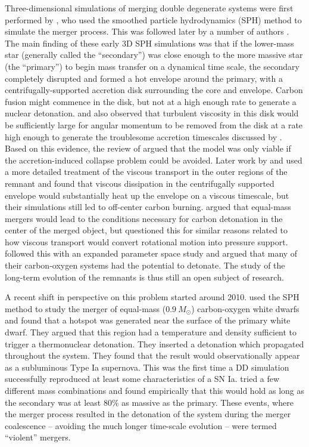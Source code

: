 \documentclass[iop]{emulateapj}
\begin{document}
Three-dimensional simulations of merging double degenerate systems were 
first performed by \citet{benz:1990}, who used the smoothed particle
hydrodynamics (SPH) method to simulate the merger process. This was 
followed later by a number of authors 
\citep{rasio_shapiro:1995,segretain:1997,guerrero:2004,yoon:2007,loren-aguilar:2009,raskin:2012}.
The main finding of these early 3D SPH simulations was that if the 
lower-mass star (generally called the ``secondary'') was
close enough to the more massive star (the ``primary'') to begin mass
transfer on a dynamical time scale, the secondary completely disrupted
and formed a hot envelope around the primary, with a
centrifugally-supported accretion disk surrounding the core and
envelope. Carbon fusion might commence in the disk, but not at a 
high enough rate to generate a nuclear detonation. \cite{mochkovitch_livio:1990} 
and \cite{livio:2000}  also observed that turbulent viscosity in this disk 
would be sufficiently large for angular momentum to be removed from the 
disk at a rate high enough to generate the troublesome accretion 
timescales discussed by \cite{tutukov_yungelson:1979}. Based on this
evidence, the review of \cite{hillebrandtniemeyer2000} argued that the
model was only viable if the accretion-induced collapse problem could
be avoided. Later work by \cite{shen:2012} and \cite{schwab:2012} used
a more detailed treatment of the viscous transport in the outer
regions of the remnant and found that viscous dissipation in the centrifugally
supported envelope would substantially heat up the envelope on a  
viscous timescale, but their simulations still led to off-center carbon
burning. \cite{vankerkwijk:2010} argued that equal-mass mergers would
lead to the conditions necessary for carbon detonation in the center
of the merged object, but \cite{shen:2012} questioned this for similar
reasons related to how viscous transport would convert rotational
motion into pressure support. \cite{zhu:2013} followed this with an
expanded parameter space study and argued that many of their
carbon-oxygen systems had the potential to detonate. The study of the
long-term evolution of the remnants is thus still an open subject of
research.

A recent shift in perspective on this problem started around 2010.
\cite{pakmor:2010} used the SPH method to study the merger of 
equal-mass ($0.9\ M_\odot$) carbon-oxygen white dwarfs and found 
that a hotspot was generated near the surface of the primary 
white dwarf. They argued that this region had a temperature 
and density sufficient to trigger a thermonuclear
detonation. They inserted a detonation which propagated throughout 
the system. They found that the result would observationally 
appear as a subluminous Type Ia supernova. This was the first time 
a DD simulation successfully reproduced at least some characteristics of a SN
Ia. \cite{pakmor:2011} tried a few different mass combinations and
found empirically that this would hold as long as the secondary was at
least 80\% as massive as the primary. These events, where the merger
process resulted in the detonation of the system during the merger
coalescence -- avoiding the much longer time-scale evolution -- were
termed ``violent'' mergers.
\end{document}
